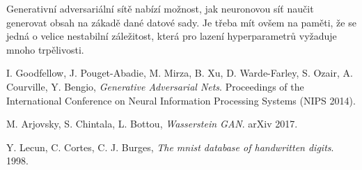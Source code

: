 \documentclass[czech]{article}
\begin{document}
Generativní adversariální sítě nabízí možnost, jak neuronovou síť naučit generovat obsah na zákadě dané datové sady.
Je třeba mít ovšem na paměti, že se jedná o velice nestabilní záležitost, která pro lazení hyperparametrů vyžaduje mnoho trpělivosti.

\newpage{}

\begin{thebibliography}{1}

 I. Goodfellow, J. Pouget-Abadie, M. Mirza, B. Xu, D. Warde-Farley, S. Ozair, A. Courville, Y. Bengio,
\emph{Generative Adversarial Nets}.
Proceedings of the International Conference on Neural Information Processing Systems (NIPS 2014).

 M. Arjovsky, S. Chintala, L. Bottou,
\emph{Wasserstein GAN}.
arXiv 2017.

 Y. Lecun, C. Cortes, C. J. Burges,
\emph{The mnist database of handwritten digits}. 1998.

\end{thebibliography}
\end{document}
